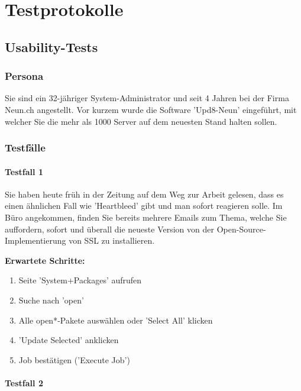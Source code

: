 \chapter{Testprotokolle} \label{appendix:test_protocols}

\section*{Usability-Tests}

\subsection*{Persona}
Sie sind ein 32-jähriger System-Administrator und seit 4 Jahren bei der Firma Neun.ch angestellt. Vor kurzem wurde die Software 'Upd8-Neun' eingeführt, mit welcher Sie die mehr als 1000 Server auf dem neuesten Stand halten sollen.

\subsection*{Testfälle}


\subsubsection*{Testfall 1}

Sie haben heute früh in der Zeitung auf dem Weg zur Arbeit gelesen, dass es einen ähnlichen Fall wie 'Heartbleed' gibt und man sofort reagieren solle. Im Büro angekommen, finden Sie bereits mehrere Emails zum Thema, welche Sie auffordern, sofort und überall die neueste Version von der Open-Source-Implementierung von SSL zu installieren.

\bigskip
\textbf{Erwartete Schritte:}

\begin{enumerate}
    \item Seite 'System+Packages' aufrufen
    \item Suche nach 'open'
    \item Alle open*-Pakete auswählen oder 'Select All' klicken
    \item 'Update Selected' anklicken
    \item Job bestätigen ('Execute Job')
\end{enumerate}



\subsubsection*{Testfall 2}

